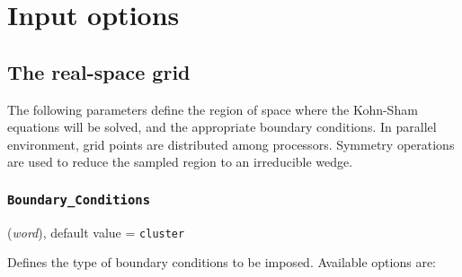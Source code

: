 \documentclass{article}
\begin{document}
\section{Input options}



\subsection{The real-space grid}

The following parameters define the region of space where the
Kohn-Sham equations will be solved, and the appropriate boundary
conditions. In parallel environment, grid points are distributed among
processors. Symmetry operations are used to reduce the sampled region
to an irreducible wedge.

\subsubsection{\tt Boundary\_Conditions
\label{BoundaryConditions}}
({\it word}),
default value = {\tt cluster }

Defines the type of boundary conditions to be imposed. Available
options are:
\end{document}
